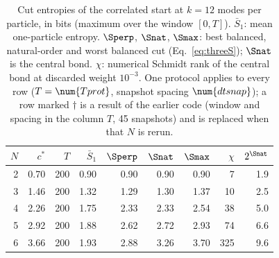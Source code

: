 \begin{table}[ht]
\centering
\small
\caption{Cut entropies of the correlated start at $k=12$ modes per particle, in bits (maximum over the window $[0,T]$). $\bar S_1$: mean one-particle entropy. $\Sperp$, $\Snat$, $\Smax$: best balanced, natural-order and worst balanced cut (Eq.~\eqref{eq:threeS}); $\Snat$ is the central bond. $\chi$: numerical Schmidt rank of the central bond at discarded weight $10^{-3}$. One protocol applies to every row ($T=\num{Tprot}$, snapshot spacing $\num{dtsnap}$); a row marked $\dagger$ is a result of the earlier code (window and spacing in the column $T$, 45 snapshots) and is replaced when that $N$ is rerun.}
\label{tab:entropy}
\begin{tabular}{rrrrrrrrr}
\toprule
$N$ & $c^*$ & $T$ & $\bar S_1$ & $\Sperp$ & $\Snat$ & $\Smax$ & $\chi$ & $2^{\Snat}$ \\
\midrule
2 & 0.70 & 200 & 0.90 & 0.90 & 0.90 & 0.90 & 7 & 1.9 \\
3 & 1.46 & 200 & 1.32 & 1.29 & 1.30 & 1.37 & 10 & 2.5 \\
4 & 2.26 & 200 & 1.75 & 2.33 & 2.33 & 2.54 & 38 & 5.0 \\
5 & 2.92 & 200 & 1.88 & 2.62 & 2.72 & 2.93 & 74 & 6.6 \\
6 & 3.66 & 200 & 1.93 & 2.88 & 3.26 & 3.70 & 325 & 9.6 \\
\bottomrule
\end{tabular}
\end{table}
